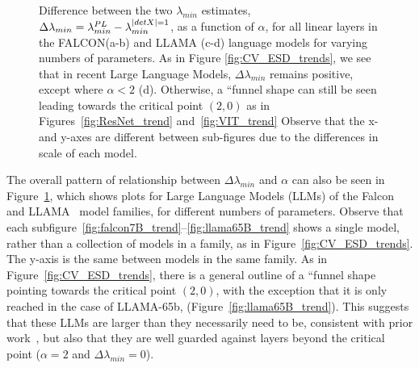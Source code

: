 \begin{figure}[t]
{      \label{fig:llama65B_trend}
    }
    \caption{Difference between the two $\lambda_{min}$ estimates, $\Delta\lambda_{min} = \lambda^{PL}_{min} - \lambda^{\vert detX\vert=1}_{min}$, 
        as a function of $\alpha$, for all linear layers in the FALCON\cite{falcon40b}(a-b) and 
        LLAMA \cite{touvron2023_TR}(c-d) language models for varying numbers of parameters. As in Figure 
        \ref{fig:CV_ESD_trends}, we see that in recent Large Language Models, $\Delta\lambda_{min}$ remains positive, 
        except where $\alpha < 2$ (d). Otherwise, a ``funnel shape can still be seen leading towards the critical 
        point $(2, 0)$ as in Figures~\ref{fig:ResNet_trend} and~\ref{fig:VIT_trend} Observe that the x- and y-axes are 
        different between sub-figures due to the differences in scale of each model.
    }
  \label{fig:LLM_ESD_trends}
\end{figure}

The overall pattern of relationship between $\Delta\lambda_{min}$ and $\alpha$ can also be seen in 
Figure~\ref{fig:LLM_ESD_trends}, which shows plots for Large Language Models (LLMs) of the Falcon~\cite{falcon40b} and 
LLAMA~\cite{touvron2023_TR} model families, for different numbers of parameters. Observe that each 
subfigure~\ref{fig:falcon7B_trend}--\ref{fig:llama65B_trend} shows a single 
model, rather than a collection of models in a family, as in Figure~\ref{fig:CV_ESD_trends}.
The y-axis is the same between models in the same family. 
As in Figure~\ref{fig:CV_ESD_trends}, there is a general outline of a ``funnel shape pointing towards the critical 
point $(2, 0)$, with the exception that it is only reached in the case of LLAMA-65b, (Figure~\ref{fig:llama65B_trend}). 
This suggests that these LLMs are larger than they necessarily need to be, consistent with prior work~\cite{YHTx21_TR}, 
but also that they are well guarded against \OverRegularized layers beyond the critical point
($\alpha=2$ and $\Delta\lambda_{min}=0$).


